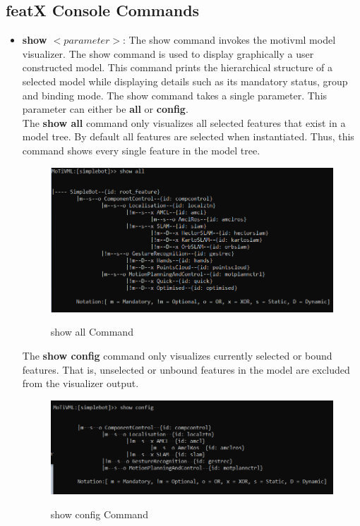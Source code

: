 \documentclass{article}
\begin{document}
\subsection{featX Console Commands}
\begin{itemize}
	\item \textbf{show $<parameter>$}: The show command invokes the motivml model visualizer. The show command is used to display graphically a user constructed model. This command prints the hierarchical structure of a selected model while displaying details such as its mandatory status, group and binding mode. The show command takes a single parameter. This parameter can either be \textbf{all} or  \textbf{config}. \\
	
	The \textbf{show all} command only visualizes all selected features that exist in a model tree. By default all features are selected when instantiated. Thus, this command shows every single feature in the model tree.
	
	\begin{figure}[H]
		\caption{show all Command}
		\centering
		\includegraphics[width=0.7\columnwidth]{images/showall.png}
		\label{showall}
	\end{figure}

	The \textbf{show config} command only visualizes currently selected or bound features. That is, unselected or unbound features in the model are excluded from the visualizer output.

	\begin{figure}[H]
		\caption{show config Command}
		\centering
		\includegraphics[width=0.7\columnwidth]{images/showconfig.png}
		\label{showconfig}
	\end{figure}
	

\end{itemize}
\end{document}
